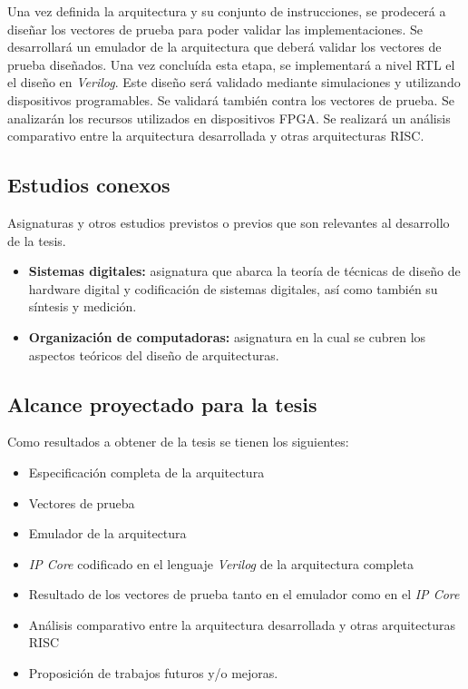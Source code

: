 \documentclass[a4paper]{article}
\begin{document}
Una vez definida la arquitectura y su conjunto de instrucciones, se prodecerá a diseñar los vectores de prueba para poder validar las implementaciones. Se desarrollará un emulador de la arquitectura que deberá validar los vectores de prueba diseñados. Una vez concluída esta etapa, se implementará a nivel RTL el el diseño en \emph{Verilog}. Este diseño será validado mediante simulaciones y utilizando dispositivos programables. Se validará también contra los vectores de prueba. Se analizarán los recursos utilizados en dispositivos FPGA. Se realizará un análisis comparativo entre la arquitectura desarrollada y otras arquitecturas RISC.

\subsection{Estudios conexos}

Asignaturas y otros estudios previstos o previos que son relevantes al desarrollo de la tesis.

\begin{itemize}
	\item \textbf{Sistemas digitales:} asignatura que abarca la teoría de técnicas de diseño de hardware digital y codificación de sistemas digitales, así como también su síntesis y medición.
	\item \textbf{Organización de computadoras:} asignatura en la cual se cubren los aspectos teóricos del diseño de arquitecturas.
\end{itemize}

\subsection{Alcance proyectado para la tesis}

Como resultados a obtener de la tesis se tienen los siguientes:

\begin{itemize}
    \item Especificación completa de la arquitectura
    \item Vectores de prueba
    \item Emulador de la arquitectura
    \item \emph{IP Core} codificado en el lenguaje \emph{Verilog} de la arquitectura completa
    \item Resultado de los vectores de prueba tanto en el emulador como en el \emph{IP Core}
    \item Análisis comparativo entre la arquitectura desarrollada y otras arquitecturas RISC
    \item Proposición de trabajos futuros y/o mejoras.
\end{itemize}
\end{document}
